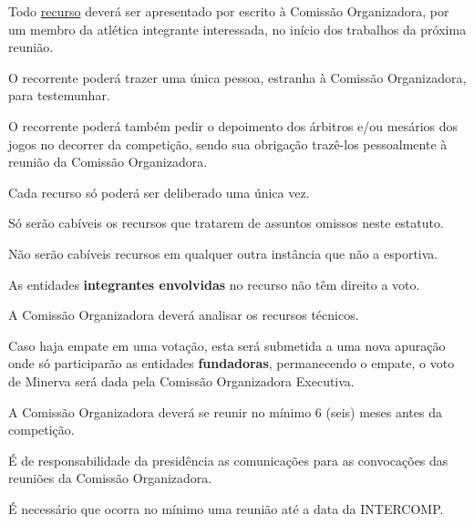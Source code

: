 \begin{article}
	Todo \underline{recurso} deverá ser apresentado por escrito à Comissão Organizadora, por um membro da atlética integrante interessada, no início dos trabalhos da próxima reunião.

	\begin{xparagraph}
		O recorrente poderá trazer uma única pessoa, estranha à Comissão Organizadora, para testemunhar.
	\end{xparagraph}

	\begin{xparagraph}
		O recorrente poderá também pedir o depoimento dos árbitros e/ou mesários dos jogos no decorrer da competição, sendo sua obrigação trazê-los pessoalmente à reunião da Comissão Organizadora.
	\end{xparagraph}

	\begin{xparagraph}
		Cada recurso só poderá ser deliberado uma única vez.
	\end{xparagraph}

	\begin{xparagraph}
		Só serão cabíveis os recursos que tratarem de assuntos omissos neste estatuto.
	\end{xparagraph}

	\begin{xparagraph}
		Não serão cabíveis recursos em qualquer outra instância que não a esportiva.
	\end{xparagraph}

	\begin{xparagraph}
		As entidades \textbf{integrantes envolvidas} no recurso não têm direito a voto.
	\end{xparagraph}

	\begin{xparagraph}
		A Comissão Organizadora deverá analisar os recursos técnicos.
	\end{xparagraph}

	\begin{xparagraph}
		Caso haja empate em uma votação, esta será submetida a uma nova apuração onde só participarão as entidades \textbf{fundadoras}, permanecendo o empate, o voto de Minerva será dada pela Comissão Organizadora Executiva.
	\end{xparagraph}
\end{article}

\begin{article}
	A Comissão Organizadora deverá se reunir no mínimo 6 (seis) meses antes da competição.

	\begin{xparagraph}
		É de responsabilidade da presidência as comunicações para as convocações das reuniões da Comissão Organizadora.
	\end{xparagraph}

	\begin{xparagraph}
		É necessário que ocorra no mínimo uma reunião até a data da INTERCOMP.
	\end{xparagraph}
\end{article}

